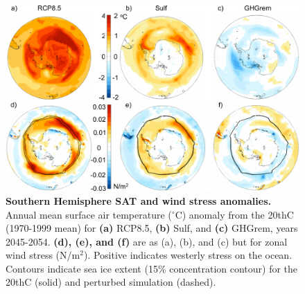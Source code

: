 \documentclass[draft,grl]{AGUTeX}  %
\begin{document}
\begin{article}
\begin{figure}[htbp] %
\centering
 \noindent\includegraphics[width=30pc]{figures/SHmaps3.pdf}
\caption{\textbf{Southern Hemisphere SAT and wind stress anomalies.} Annual mean surface air temperature ($^\circ$C) anomaly from the 20thC (1970-1999 mean) for \textbf{(a)} RCP8.5, \textbf{(b)} Sulf, and \textbf{(c)} GHGrem, years 2045-2054. \textbf{(d), (e), and (f)} are as (a), (b), and (c) but for zonal wind stress (N/m$^2$). Positive indicates westerly stress on the ocean. Contours indicate sea ice extent (15\% concentration contour) for the 20thC (solid) and perturbed simulation (dashed).}
\label{fig:shmaps}
\end{figure}



\end{article}
\end{document}
